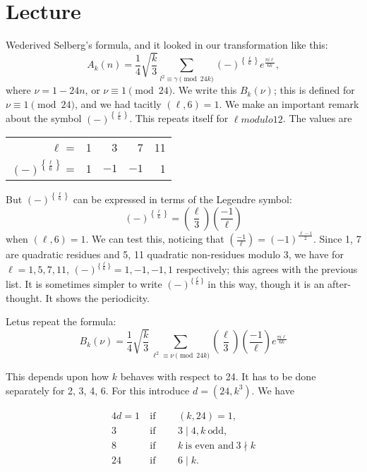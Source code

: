 \chapter{Lecture}\label{part3:lec24} %

We\pageoriginale derived Selberg's formula, and it looked in our
transformation like this:
$$
A_k (n) = \frac{1}{4} \sqrt{\frac{k}{3}} \sum_{l^2 \equiv \gamma
  \pmod{24 k}} (-) ^{\left\{ \frac{\ell}{6} \right\}} e^{\frac{\pi i \ell}{6 k}}, 
$$
where $\nu = 1- 24n$, or $\nu\equiv 1 \pmod{24}$. We write this
$B_k(\nu)$; this is defined for $\nu \equiv 1 \pmod{24}$, and we had
tacitly $(\ell, 6)=1$. We make an important remark about the symbol
$(-)^{\left\{\frac{\ell}{6}\right\}}$. This repeats itself for $\ell modulo 12$. The
values are 

\medskip
\begin{tabular}{rrrrr}
  $\ell$ =& 1\quad &3 \quad &7 \quad &11\\
  $(-)^{\left\{ \frac{\ell}{6}\right\}}$ =& 1 \quad &$-1$ \quad &$-1$ \quad &1 
\end{tabular}

But $(-)^{\left\{\frac{\ell}{6} \right\}}$ can be expressed in terms
of the Legendre symbol:
$$
(-)^{\left\{\frac{\ell}{6} \right\}}= \left( \frac{\ell}{3} \right)
\left( \frac{-1}{\ell}\right)
$$
when $(\ell, 6)=1$. We can test this, noticing that $\left(
\frac{-1}{\ell}\right)= (-1)^{\frac{\ell-1}{2}}$. Since 1, 7 are
quadratic residues and 5, 11 quadratic non-residues modulo 3, we have
for $\ell =1,5, 7, 11$, $(-)^{\{\frac{\ell}{6} \}}= 1, -1, -1, 1$
respectively; this agrees with the previous list. It is sometimes
simpler to write $(-)^{\{\frac{\ell}{6} \}}$ in this way, though it is
an after-thought. It shows the periodicity.

Let\pageoriginale us repeat the formula:
$$
B_k (\nu) = \frac{1}{4} \sqrt{\frac{k}{3}} \sum_{\ell^2 \equiv \nu
  \pmod{24 k}} \left( \frac{\ell}{3}\right)  \left(
\frac{-1}{\ell}\right) e^{\frac{\pi i \ell}{6k}}
$$

This depends upon how $k$ behaves with respect to 24. It has to be
done separately for 2, 3, 4, 6. For this introduce $d= (24, k^3)$. We
have

\begin{alignat*}{4}
  d=1 & ~\text{if}~ &~~& (k, 24) =1,\\
  3 & ~\text{if}~ &&3\mid 4, k ~\text{odd},\\
  8 & ~\text{if}~ && k ~\text{is even and}~ 3 \nmid k\\
  24 & ~\text{if}~  && 6\mid k.
\end{alignat*}

